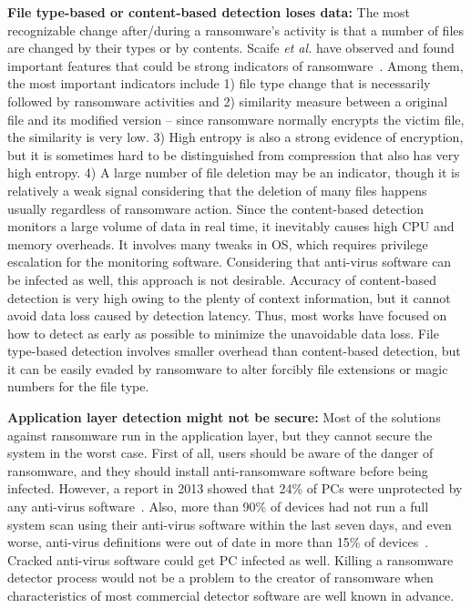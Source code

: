 \documentclass[conference]{IEEEtran}
\newcommand{\etal}{{\it et al.}\xspace}
\begin{document}
{\bf File type-based or content-based detection loses data:} 
The most recognizable change after/during a ransomware's activity
is that a number of files are changed by their types or by
contents.  Scaife \etal have observed and found important features
that could be strong indicators of ransomware~\cite{scaife16}.
Among them, the most important indicators include 1) file type
change that is necessarily followed by ransomware activities and 2)
similarity measure between a original file and its modified version
-- since ransomware normally encrypts the victim file, the
similarity is very low.  3) High entropy is also a strong evidence
of encryption, but it is sometimes hard to be distinguished from
compression that also has very high entropy. 4) A large number of
file deletion may be an indicator, though it is relatively a weak
signal considering that the deletion of many files happens usually
regardless of ransomware action.  Since the content-based detection
monitors a large volume of data in real time, it inevitably causes
high CPU and memory overheads.  It involves many tweaks in OS,
which requires privilege escalation for the monitoring software.
Considering that anti-virus software can be infected as well, this
approach is not desirable.  Accuracy of content-based detection is
very high owing to the plenty of context information, but it cannot
avoid data loss caused by detection latency. Thus, most works have
focused on how to detect as early as possible to minimize the
unavoidable data loss.  File type-based detection involves smaller
overhead than content-based detection, but it can be easily evaded
by ransomware to alter forcibly file extensions or magic numbers
for the file type.

{\bf Application layer detection might not be secure:}
Most of the solutions against ransomware run in the application
layer, but they cannot secure the system in the worst case.  First
of all, users should be aware of the danger of ransomware, and they
should install anti-ransomware software before being infected.
However, a report in 2013 showed that 24\% of PCs were unprotected
by any anti-virus software~\cite{unprotected}.  Also, more than
90\% of devices had not run a full system scan using their
anti-virus software within the last seven days, and even worse,
anti-virus definitions were out of date in more than 15\% of
devices~\cite{antivirus}. Cracked anti-virus software could get PC
infected as well.  Killing a ransomware detector process would not
be a problem to the creator of ransomware when characteristics of
most commercial detector software are well known in advance.
\end{document}
